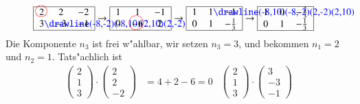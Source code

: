 \begin{beispiel}
\begin{align*}
\begin{tabular}{|>{$}c<{$}>{$}c<{$}>{$}c<{$}|}
\hline
2%
\begin{picture}(0,0)
\color{red}\put(-3,4){\circle{12}}
\end{picture}%
&2&-2\\
3%
\begin{picture}(0,0)%
\color{blue}\drawline(-8,-2)(-8,10)(2,10)(2,-2)
\end{picture}%
&-3&-1\\
\hline
\end{tabular}
&\rightarrow
\begin{tabular}{|>{$}c<{$}>{$}c<{$}>{$}c<{$}|}
\hline
1&1&-1\\
0&-6%
\begin{picture}(0,0)%
\color{red}\put(-7,4){\circle{15}}
\end{picture}%
&2\\
\hline
\end{tabular}
\rightarrow
\begin{tabular}{|>{$}c<{$}>{$}c<{$}>{$}c<{$}|}
\hline
1&1%
\begin{picture}(0,0)
\color{blue}\drawline(-8,10)(-8,-2)(2,-2)(2,10)
\end{picture}%
&-1\\
0&1&-\frac13\\
\hline
\end{tabular}
\rightarrow
\begin{tabular}{|>{$}c<{$}>{$}c<{$}>{$}c<{$}|}
\hline
1&0&-\frac23\\
0&1&-\frac13\\
\hline
\end{tabular}
\end{align*}
Die Komponente $n_3$ ist frei w"ahlbar, wir setzen $n_3=3$, und bekommen
$n_1=2$ und $n_2=1$.
Tats"achlich ist
\begin{align*}
\begin{pmatrix}2\\1\\3\end{pmatrix}
\cdot
\begin{pmatrix}2\\2\\-2\end{pmatrix}
&=4+2-6=0
&
\begin{pmatrix}2\\1\\3\end{pmatrix}
\cdot
\begin{pmatrix}3\\-3\\-1\end{pmatrix}

\end{align*}
\end{beispiel}
